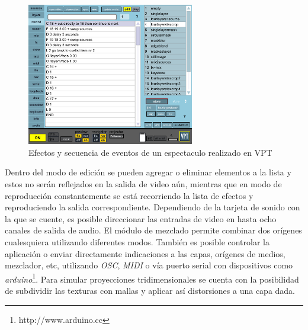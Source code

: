 \begin{figure}[H]
  \centering
    \includegraphics[width=0.65\textwidth]{./Cap3_aplicaciones/apps-vpt-cuelist.png}
  \caption{Efectos y secuencia de eventos de un espectaculo realizado en VPT}
  \label{fig:Apps-VPTCuelist}
\end{figure}

Dentro del modo de edición se pueden agregar o eliminar elementos a la lista y estos no serán reflejados en la salida de video aún, mientras que en modo de reproducción constantemente se está recorriendo la lista de efectos y reproduciendo la salida correspondiente.
Dependiendo de la tarjeta de sonido con la que se cuente, es posible direccionar las entradas de video en hasta ocho canales de salida de audio. El módulo de mezclado permite combinar dos orígenes cualesquiera utilizando diferentes modos. También es posible controlar la aplicación o enviar directamente indicaciones a las capas, orígenes de medios, mezclador, etc, utilizando \emph{OSC}, \emph{MIDI} o vía puerto serial con dispositivos como \emph{arduino}\footnote{http://www.arduino.cc}.
Para simular proyecciones tridimensionales se cuenta con la posibilidad de subdividir las texturas con mallas y aplicar así distorsiones a una capa dada.
